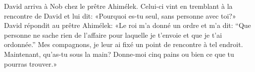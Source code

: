 David arriva à Nob chez le prêtre Ahimélek.
Celui-ci vint en tremblant à la rencontre de David et lui dit:
	«Pourquoi es-tu seul, sans personne avec toi?»
David répondit au prêtre Ahimélek:
	«Le roi m’a donné un ordre et m’a dit:
	“Que personne ne sache rien de l’affaire pour laquelle je t’envoie
		et que je t’ai ordonnée.”
Mes compagnons, je leur ai fixé un point de rencontre à tel endroit.
Maintenant, qu’as-tu sous la main?
Donne-moi cinq pains ou bien ce que tu pourras trouver.»
